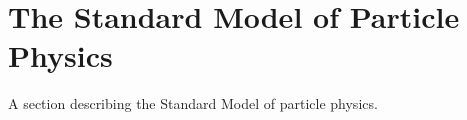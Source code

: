 \chapter{The Standard Model of Particle Physics}
\label{chap:sm}

A section describing the Standard Model of particle physics.
